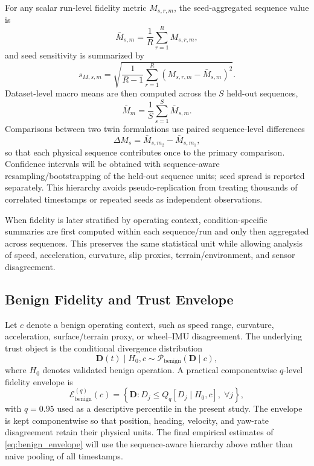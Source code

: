 \documentclass[conference]{IEEEtran}
\begin{document}
For any scalar run-level fidelity metric $M_{s,r,m}$, the seed-aggregated sequence value is
\begin{equation}
\bar M_{s,m}=\frac{1}{R}\sum_{r=1}^{R}M_{s,r,m},
\end{equation}
and seed sensitivity is summarized by
\begin{equation}
s_{M,s,m}=
\sqrt{\frac{1}{R-1}\sum_{r=1}^{R}\left(M_{s,r,m}-\bar M_{s,m}\right)^2}.
\label{eq:seed_sd}
\end{equation}
Dataset-level macro means are then computed across the $S$ held-out sequences,
\begin{equation}
\bar M_m=\frac{1}{S}\sum_{s=1}^{S}\bar M_{s,m}.
\end{equation}
Comparisons between two twin formulations use paired sequence-level differences
\begin{equation}
\Delta M_s=\bar M_{s,m_2}-\bar M_{s,m_1},
\end{equation}
so that each physical sequence contributes once to the primary comparison. Confidence intervals will be obtained with sequence-aware resampling/bootstrapping of the held-out sequence units; seed spread is reported separately. This hierarchy avoids pseudo-replication from treating thousands of correlated timestamps or repeated seeds as independent observations.

When fidelity is later stratified by operating context, condition-specific summaries are first computed within each sequence/run and only then aggregated across sequences. This preserves the same statistical unit while allowing analysis of speed, acceleration, curvature, slip proxies, terrain/environment, and sensor disagreement.

\subsection{Benign Fidelity and Trust Envelope}
Let $c$ denote a benign operating context, such as speed range, curvature, acceleration, surface/terrain proxy, or wheel--IMU disagreement. The underlying trust object is the conditional divergence distribution
\begin{equation}
\mathbf{D}(t)\mid H_0,c
\sim \mathcal{P}_{\mathrm{benign}}(\mathbf{D}\mid c),
\label{eq:benign_distribution}
\end{equation}
where $H_0$ denotes validated benign operation. A practical componentwise $q$-level fidelity envelope is
\begin{equation}
\mathcal{E}_{\mathrm{benign}}^{(q)}(c)
=\left\{\mathbf{D}:D_j\le Q_q[D_j\mid H_0,c],\;\forall j\right\},
\label{eq:benign_envelope}
\end{equation}
with $q=0.95$ used as a descriptive percentile in the present study. The envelope is kept componentwise so that position, heading, velocity, and yaw-rate disagreement retain their physical units. The final empirical estimates of \eqref{eq:benign_envelope} will use the sequence-aware hierarchy above rather than naive pooling of all timestamps.
\end{document}
